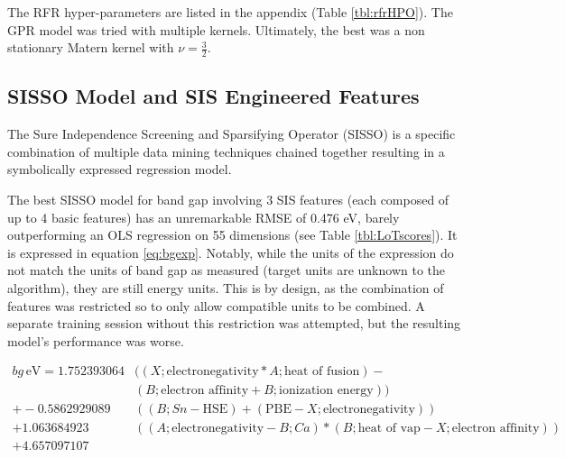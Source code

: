 The RFR hyper-parameters are listed in the appendix (Table \ref{tbl:rfrHPO}).
The GPR model was tried with multiple kernels.
Ultimately, the best was a non stationary Matern kernel with \(\nu = \frac{3}{2}\).

\subsection{SISSO Model and SIS Engineered Features}
\label{sec:orgf476608}
The Sure Independence Screening and Sparsifying Operator (SISSO) is a specific combination of multiple data mining techniques chained together resulting in a symbolically expressed regression model.
\autocite{ouyang-2018-sisso,ghiringhelli-2017-learn-physic} 

The best SISSO model for band gap involving 3 SIS features (each composed of up to 4 basic features) has an unremarkable RMSE of 0.476 eV, barely outperforming an OLS regression on 55 dimensions (see Table \ref{tbl:LoTscores}).
It is expressed in equation \ref{eq:bgexp}.
Notably, while the units of the expression do not match the units of band gap as measured (target units are unknown to the algorithm), they are still energy units.
This is by design, as the combination of features was restricted so to only allow compatible units to be combined.
A separate training session without this restriction was attempted, but the resulting model's performance was worse.

\begin{align}
\label{eq:bgexp}
bg\,\si{\electronvolt} = 1.752393064 &((X;\mbox{electronegativity}*A;\mbox{heat of fusion})-\nonumber\\&(B;\mbox{electron affinity}+B;\mbox{ionization energy}))\nonumber\\+-0.5862929089 &((B;Sn-\mbox{HSE})+(\mbox{PBE}-X;\mbox{electronegativity}))\nonumber\\+1.063684923 &((A;\mbox{electronegativity}-B;Ca)*(B;\mbox{heat of vap}-X;\mbox{electron affinity}))\nonumber\\+4.657097107
\end{align}

